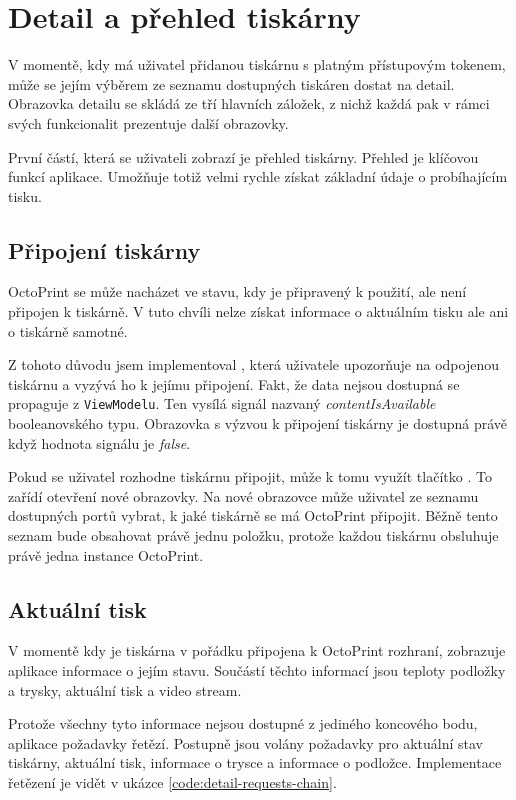 \section{Detail a přehled tiskárny}

V momentě, kdy má uživatel přidanou tiskárnu s platným přístupovým tokenem, může se jejím výběrem ze seznamu dostupných tiskáren dostat na detail.
Obrazovka detailu se skládá ze tří hlavních záložek, z nichž každá pak v rámci svých funkcionalit prezentuje další obrazovky.

První částí, která se uživateli zobrazí je přehled tiskárny.
Přehled je klíčovou funkcí aplikace.
Umožňuje totiž velmi rychle získat základní údaje o probíhajícím tisku.

\subsection{Připojení tiskárny}

OctoPrint se může nacházet ve stavu, kdy je připravený k použití, ale není připojen k tiskárně.
V tuto chvíli nelze získat informace o aktuálním tisku ale ani o tiskárně samotné.

Z tohoto důvodu jsem implementoval , která uživatele upozorňuje na odpojenou tiskárnu a vyzývá ho k jejímu připojení.
Fakt, že data nejsou dostupná se propaguje z \texttt{ViewModelu}.
Ten vysílá signál nazvaný \textit{contentIsAvailable} booleanovského typu.
Obrazovka s výzvou k připojení tiskárny je dostupná právě když hodnota signálu je \textit{false}.

Pokud se uživatel rozhodne tiskárnu připojit, může k tomu využít tlačítko .
To zařídí otevření nové obrazovky.
Na nové obrazovce může uživatel ze seznamu dostupných portů vybrat, k jaké tiskárně se má OctoPrint připojit.
Běžně tento seznam bude obsahovat právě jednu položku, protože každou tiskárnu obsluhuje právě jedna instance OctoPrint.

\subsection{Aktuální tisk}

V momentě kdy je tiskárna v pořádku připojena k OctoPrint rozhraní, zobrazuje aplikace informace o jejím stavu.
Součástí těchto informací jsou teploty podložky a trysky, aktuální tisk a video stream.

Protože všechny tyto informace nejsou dostupné z jediného koncového bodu, aplikace požadavky řetězí.
Postupně jsou volány požadavky pro aktuální stav tiskárny, aktuální tisk, informace o trysce a informace o podložce.
Implementace řetězení je vidět v ukázce \ref{code:detail-requests-chain}.

